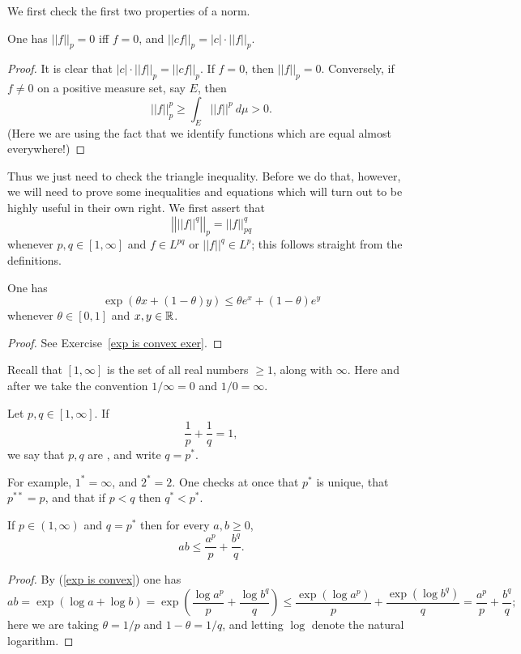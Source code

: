 We first check the first two properties of a norm.
\begin{lemma}
One has $||f||_{p}  = 0$ iff $f = 0$, and $||cf||_{p}  = |c|\cdot||f||_{p} $.
\end{lemma}
\begin{proof}
It is clear that $|c|\cdot||f||_{p}  = ||cf||_{p} $.
If $f = 0$, then $||f||_{p}  = 0$.
Conversely, if $f \neq 0$ on a positive measure set, say $E$, then
\[||f||_{p} ^{p} \geq \int_{E} ||f||^{p} ~d\mu > 0.\]
(Here we are using the fact that we identify functions which are equal almost everywhere!)
\end{proof}

Thus we just need to check the triangle inequality. Before we do that, however, we will need to prove some inequalities and equations which will turn out to be highly useful in their own right.
We first assert that
\begin{equation}\label{pull exponent of Lp}
\left|\left|||f||^{q}\right|\right|_{p}  = ||f||_{pq}^{q}
\end{equation}
whenever $p, q \in [1, \infty]$ and $f \in L^{pq}$ or $||f||^{q} \in L^{p}$; this follows straight from the definitions.

\begin{lemma}
One has
\begin{equation}\label{exp is convex}
\exp(\theta x + (1 - \theta)y) \leq \theta e^{x} + (1 - \theta)e^{y}
\end{equation}
whenever $\theta \in [0, 1]$ and $x, y \in \mathbb{R}$.
\end{lemma}
\begin{proof}
See Exercise~\ref{exp is convex exer}.
\end{proof}

Recall that $[1, \infty]$ is the set of all real numbers $\geq 1$, along with $\infty$.
Here and after we take the convention $1/\infty = 0$ and $1/0 = \infty$.

\begin{definition}
Let $p, q \in [1, \infty]$. If
\[\frac{1}{p} + \frac{1}{q} = 1,\]
we say that $p, q$ are , and write $q = p^{*}$.
\end{definition}

For example, $1^{*} = \infty$, and $2^{*} = 2$. One checks at once that $p^{*}$ is unique, that $p^{**} = p$, and that if $p < q$ then $q^{*} < p^{*}$.

\begin{theorem}
If $p \in (1, \infty)$ and $q = p^{*}$ then for every $a,b \geq 0$,
\[ab \leq \frac{a^{p}}{p} + \frac{b^{q}}{q}.\]
\end{theorem}
\begin{proof}
By (\ref{exp is convex}) one has
\[ab = \exp(\log a + \log b) = \exp\left(\frac{\log a^{p}}{p} + \frac{\log b^{q}}{q}\right) \leq \frac{\exp(\log a^{p})}{p} + \frac{\exp(\log b^{q})}{q} = \frac{a^{p}}{p} + \frac{b^{q}}{q};\]
here we are taking $\theta = 1/p$ and $1 - \theta = 1/q$, and letting $\log$ denote the natural logarithm.
\end{proof}

